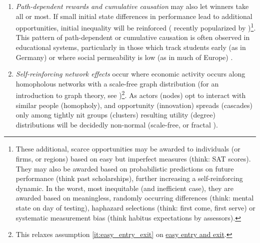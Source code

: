 \begin{enumerate}
	The truth, as often, will lie somewhere in between, and greatly depend on circumstance. Some of the divergence between scalable and unscalable occupations will fall on workers, some on consumers and much will be split\footnote{
		Such flexibility does justice to \cite{Baumol1965} original insight, which started out as an empirical observation on the relative pay of the performing arts, and not as an(other) iron law of wages (c.f. \citealt{Malthus1798}).}. 

	\item {} \label{sec:cumulative_causation} \emph{Path-dependent rewards and cumulative causation} may also let winners take all or most. If small initial state differences in performance lead to additional opportunities, initial inequality will be reinforced (\citealt{Jackson1968, Merton1988} recently popularized by \citealt{Gladwell})\footnote{
		These additional, scarce opportunities may be awarded to individuals (or firms, or regions) based on easy but imperfect measures (think: SAT scores). They may also be awarded based on probabilistic predictions on future performance (think past scholarships), further increasing a self-reinforcing dynamic. In the worst, most inequitable (and inefficient case), they are awarded based on meaningless, randomly occurring differences (think: mental state on day of testing), haphazard selections (think: first come, first serve) or systematic measurement bias (think habitus expectations by assessors).}. 
	This pattern of path-dependent or cumulative causation is often observed in educational systems, particularly in those which track students early (as in Germany) or where social permeability is low (as in much of Europe) \citep{OECD2006}.

	\item {} \label{sec:network_effects} \emph{Self-reinforcing network effects} occur where economic activity occurs along homopholous networks with a scale-free graph distribution (for an introduction to graph theory, see \citealt{Kleinberg-2009-oz})\footnote{
		This relaxes  assumption \ref{it:easy_entry_exit} on \hyperref[it:easy_entry_exit]{easy entry and exit}.}.
	As actors (nodes) opt to interact with similar people (homopholy), and opportunity (innovation) spreads (cascades) only among tightly nit groups (clusters) \citep{Bass1969} resulting utility (degree) distributions will be decidedly non-normal (scale-free, or fractal \citep{Mandelbrot2004}). 
	
	

\end{enumerate}
